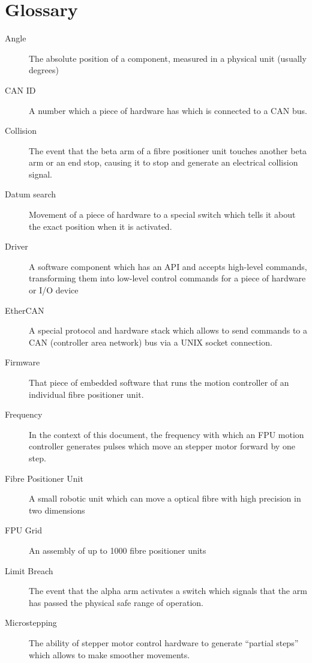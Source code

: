 \documentclass[fontsize=12,a4paper]{scrreprt}
\begin{document}
\chapter{Glossary}
\begin{description}
\item[Angle] The absolute position of a component, measured in a
  physical unit (usually degrees)

\item[CAN ID] A number which a piece of hardware has which is
  connected to a CAN bus.

\item[Collision] The event that the beta arm of a fibre positioner unit
  touches another beta arm or an end stop, causing it to stop and
  generate an electrical collision signal.

\item[Datum search] Movement of a piece of hardware to a special
  switch which tells it about the exact position when it is activated.

\item[Driver] A software component which has an API and accepts
  high-level commands, transforming them into low-level control
  commands for a piece of hardware or I/O device

\item[EtherCAN] A special protocol and hardware stack which allows to
  send commands to a CAN (controller area network) bus via a UNIX
  socket connection.

\item[Firmware] That piece of embedded software that runs the motion
  controller of an individual fibre positioner unit.

\item[Frequency] In the context of this document, the frequency with
  which an FPU motion controller generates pulses which move an
  stepper motor forward by one step.

\item[Fibre Positioner Unit] A small robotic unit which can move a
  optical fibre with high precision in two dimensions

\item[FPU Grid] An assembly of up to 1000 fibre positioner units

\item[Limit Breach] The event that the alpha arm activates a switch
  which signals that the arm has passed the physical safe range of
  operation.

\item[Microstepping] The ability of stepper motor control hardware to
  generate ``partial steps'' which allows to make smoother movements.


\end{description}
\end{document}
